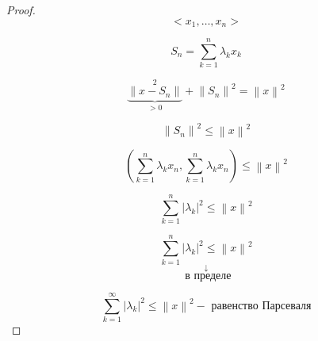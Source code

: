 \documentclass[12pt, a4paper]{report}
\begin{document}
\begin{proof}
    \[ <x_1, \ldots, x_n> \] 

    \[ S_n = \sum_{k =1}^{n  }   \lambda_k x_k\] 

    \[\underbrace{ \left\lVert x - S_n   \right\rVert}_{> 0} ^2   + \left\lVert S_n      \right\rVert ^2 = \left\lVert x  \right\rVert ^2 \] 

    \[ \left\lVert  S_n      \right\rVert  ^2 \le  \left\lVert x  \right\rVert ^2 \] 

    \[ \left( \sum_{k=1} ^{n  } \lambda_k x_n , \sum_{k=1} ^{n  } \lambda_k x_n  \right) \le  \left\lVert x  \right\rVert ^2 \] 

    \[ \sum_{k=1} ^{n  } \left\lvert \lambda_k     \right\rvert ^2 \le  \left\lVert x  \right\rVert ^2 \] 

    \[ \sum_{k=1} ^{n  } \left\lvert \lambda_k     \right\rvert ^2 \le  \left\lVert x  \right\rVert ^2 \] 
    \[ \overset{\displaystyle \downarrow }{\text{ в пределе}}  \]

    \[ \sum_{k=1} ^{\infty  } \left\lvert \lambda_k     \right\rvert ^2 \le  \left\lVert x  \right\rVert ^2   - \text{ равенство Парсеваля}  \] 

\end{proof}




\ifdefined\mainfile
\else
\end{document}
